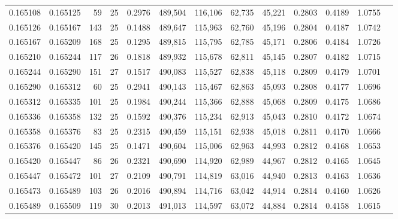 \begin{tabular}{rrrrrrrrrrrrr}
0.165108 & 0.165125 &  59 &  25 &                                     0.2976 & 489,504 & 116,106 &  62,735 &  45,221 & 0.2803 & 0.4189 & 1.0755 \\
0.165126 & 0.165167 & 143 &  25 &                                     0.1488 & 489,647 & 115,963 &  62,760 &  45,196 & 0.2804 & 0.4187 & 1.0742 \\
0.165167 & 0.165209 & 168 &  25 &                                     0.1295 & 489,815 & 115,795 &  62,785 &  45,171 & 0.2806 & 0.4184 & 1.0726 \\
0.165210 & 0.165244 & 117 &  26 &                                     0.1818 & 489,932 & 115,678 &  62,811 &  45,145 & 0.2807 & 0.4182 & 1.0715 \\
0.165244 & 0.165290 & 151 &  27 &                                     0.1517 & 490,083 & 115,527 &  62,838 &  45,118 & 0.2809 & 0.4179 & 1.0701 \\
0.165290 & 0.165312 &  60 &  25 &                                     0.2941 & 490,143 & 115,467 &  62,863 &  45,093 & 0.2808 & 0.4177 & 1.0696 \\
0.165312 & 0.165335 & 101 &  25 &                                     0.1984 & 490,244 & 115,366 &  62,888 &  45,068 & 0.2809 & 0.4175 & 1.0686 \\
0.165336 & 0.165358 & 132 &  25 &                                     0.1592 & 490,376 & 115,234 &  62,913 &  45,043 & 0.2810 & 0.4172 & 1.0674 \\
0.165358 & 0.165376 &  83 &  25 &                                     0.2315 & 490,459 & 115,151 &  62,938 &  45,018 & 0.2811 & 0.4170 & 1.0666 \\
0.165376 & 0.165420 & 145 &  25 &                                     0.1471 & 490,604 & 115,006 &  62,963 &  44,993 & 0.2812 & 0.4168 & 1.0653 \\
0.165420 & 0.165447 &  86 &  26 &                                     0.2321 & 490,690 & 114,920 &  62,989 &  44,967 & 0.2812 & 0.4165 & 1.0645 \\
0.165447 & 0.165472 & 101 &  27 &                                     0.2109 & 490,791 & 114,819 &  63,016 &  44,940 & 0.2813 & 0.4163 & 1.0636 \\
0.165473 & 0.165489 & 103 &  26 &                                     0.2016 & 490,894 & 114,716 &  63,042 &  44,914 & 0.2814 & 0.4160 & 1.0626 \\
0.165489 & 0.165509 & 119 &  30 &                                     0.2013 & 491,013 & 114,597 &  63,072 &  44,884 & 0.2814 & 0.4158 & 1.0615 \\

\end{tabular}
